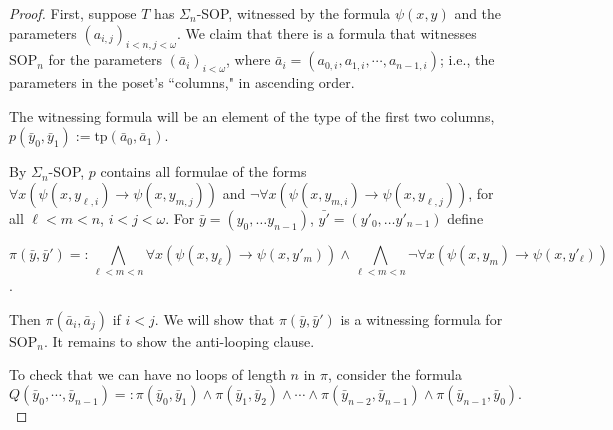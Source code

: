 \documentclass{article}
\newcommand{\tp}{\text{tp}}
\newcommand{\SOP}{\text{SOP}}
\newcommand{\vphi}{\varphi}
\theoremstyle{definition}
\theoremstyle{definition}
\theoremstyle{definition}
\begin{document}
\begin{proof}
    First, suppose $T$ has $\Sigma_n$-SOP, witnessed by the formula $\psi(x,y)$ and the parameters $(a_{i,j})_{i<n, j<\omega}$. %
    We claim that there is a formula that witnesses $\SOP_n$ for the parameters $(\bar{a}_i)_{i<\omega}$, where $\bar{a}_i=(a_{0,i}, a_{1,i},\dotsm, a_{n-1,i})$; i.e., the parameters in the poset's ``columns," in ascending order. 
    

    The witnessing formula will be an element of the type of the first two columns, $p(\bar{y}_0, \bar{y}_1):=\tp(\bar{a}_0, \bar{a}_1)$.

    By $\Sigma_n$-SOP, $p$ contains all formulae of the forms $\forall x(\psi(x, y_{\ell,i})\to \psi(x, y_{m,j}))$ and $\neg \forall x(\psi(x, y_{m,i})\to \psi(x, y_{\ell, j}))$, for all $\ell<m<n$, $i < j < \omega$. For $\bar{y}=(y_{0}, \ldots y_{n-1})$, $\bar{y'}=(y'_{0}, \ldots y'_{n-1})$ define 
    
    $$\pi(\bar{y}, \bar{y}')=: \bigwedge_{\ell < m < n} \forall x(\psi(x, y_{\ell})\to \psi(x, y'_{m})) \wedge \bigwedge_{\ell < m < n} \neg \forall x(\psi(x, y_{m})\to \psi(x, y'_{\ell})) $$.

    Then $\pi(\bar{a}_{i}, \bar{a}_{j})$ if $i < j$. We will show that $\pi(\bar{y}, \bar{y}')$ is a witnessing formula for $\mathrm{SOP}_{n}$. It remains to show the anti-looping clause.

    To check that we can have no loops of length $n$ in $\pi$, consider the formula %
    \[Q(\bar{y}_0,\dotsm, \bar{y}_{n-1})=: \pi(\bar{y}_0,\bar{y}_1)\wedge \pi(\bar{y}_1,\bar{y}_2)\wedge\dotsm \wedge \pi(\bar{y}_{n-2},\bar{y}_{n-1})\wedge \pi(\bar{y}_{n-1},\bar{y}_0).\] %


\end{proof}
\end{document}
